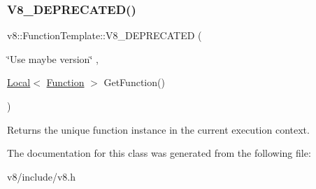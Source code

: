 \subsubsection{\texorpdfstring{V8\+\_\+\+D\+E\+P\+R\+E\+C\+A\+T\+E\+D()}{V8\_DEPRECATED()}}
{\footnotesize\ttfamily v8\+::\+Function\+Template\+::\+V8\+\_\+\+D\+E\+P\+R\+E\+C\+A\+T\+ED (\begin{DoxyParamCaption}\item[{\char`\"{}Use maybe version\char`\"{}}]{,  }\item[{\mbox{\hyperlink{classv8_1_1Local}{Local}}$<$ \mbox{\hyperlink{classv8_1_1Function}{Function}} $>$ }]{Get\+Function() }\end{DoxyParamCaption})}

Returns the unique function instance in the current execution context. 

The documentation for this class was generated from the following file\+:\begin{DoxyCompactItemize}
\item 
v8/include/v8.\+h\end{DoxyCompactItemize}
